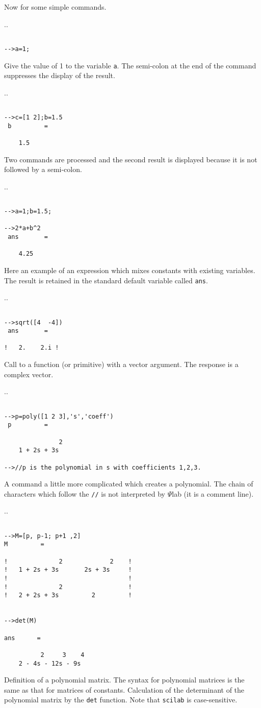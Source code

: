 	Now for some simple commands.

\noindent.\dotfill.
\begin{verbatim}

-->a=1;
\end{verbatim}
Give the value of 1 to the variable {\tt a}.  The semi-colon
at the end of the command suppresses the display of the result.

\noindent.\dotfill.
\begin{verbatim}
 
-->c=[1 2];b=1.5
 b         =
 
    1.5  
\end{verbatim}
Two commands are processed and the second result is displayed because
it is not followed by a semi-colon.

\noindent.\dotfill.
\begin{verbatim}
 
-->a=1;b=1.5;
 
-->2*a+b^2
 ans       =
 
    4.25  
\end{verbatim}
Here an example of an expression which mixes constants with existing
variables.  The result is retained in the standard default variable 
called {\tt ans}.

\noindent.\dotfill.
\begin{verbatim}
 
-->sqrt([4  -4])
 ans       =
 
!   2.    2.i !
\end{verbatim} 
Call to a function (or primitive) with a vector argument.  The response
is a complex vector.

\noindent.\dotfill.
\begin{verbatim}
 
-->p=poly([1 2 3],'s','coeff')
 p         =
 
               2  
    1 + 2s + 3s   
 
-->//p is the polynomial in s with coefficients 1,2,3.
\end{verbatim}
A command a little more complicated which creates a polynomial.  The
chain of characters which follow the {\tt //} is not interpreted by
$\Psi$lab (it is a comment line).

\noindent.\dotfill.
\begin{verbatim}

-->M=[p, p-1; p+1 ,2]
M         =
 
!              2             2    !
!   1 + 2s + 3s       2s + 3s     !
!                                 !
!              2                  !
!   2 + 2s + 3s         2         !
 

-->det(M)

ans      =

          2     3    4  
    2 - 4s - 12s - 9s   

\end{verbatim}
Definition of a polynomial matrix. The syntax for polynomial matrices
is the same as that for matrices of constants. Calculation of the
determinant of the polynomial matrix by the {\tt det} function. 
Note that {\tt scilab} is case-sensitive.

